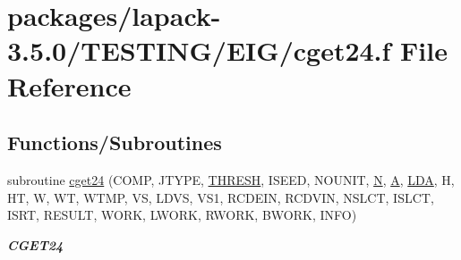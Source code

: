 \hypertarget{cget24_8f}{}\section{packages/lapack-\/3.5.0/\+T\+E\+S\+T\+I\+N\+G/\+E\+I\+G/cget24.f File Reference}
\label{cget24_8f}
\subsection*{Functions/\+Subroutines}
\begin{DoxyCompactItemize}
\item 
subroutine \hyperlink{group__complex__eig_gafb74cf216cc7b889b8b724e1917e0cd7}{cget24} (C\+O\+M\+P, J\+T\+Y\+P\+E, \hyperlink{zlaqgs_8c_a0656018abfc9fa2821827415f5d5ea57}{T\+H\+R\+E\+S\+H}, I\+S\+E\+E\+D, N\+O\+U\+N\+I\+T, \hyperlink{polmisc_8c_a0240ac851181b84ac374872dc5434ee4}{N}, \hyperlink{classA}{A}, \hyperlink{example__user_8c_ae946da542ce0db94dced19b2ecefd1aa}{L\+D\+A}, H, H\+T, W, W\+T, W\+T\+M\+P, V\+S, L\+D\+V\+S, V\+S1, R\+C\+D\+E\+I\+N, R\+C\+D\+V\+I\+N, N\+S\+L\+C\+T, I\+S\+L\+C\+T, I\+S\+R\+T, R\+E\+S\+U\+L\+T, W\+O\+R\+K, L\+W\+O\+R\+K, R\+W\+O\+R\+K, B\+W\+O\+R\+K, I\+N\+F\+O)
\begin{DoxyCompactList}\small\item\em {\bfseries C\+G\+E\+T24} \end{DoxyCompactList}\end{DoxyCompactItemize}
